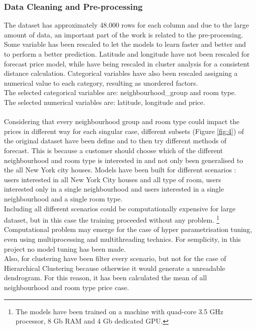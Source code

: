 \documentclass{FR16}
\begin{document}
\newpage
\subsubsection{Data Cleaning and Pre-processing}

The dataset has approximately 48.000 rows for each column and due to the large amount of data, an important part of the work is related to the pre-processing. Some variable has been rescaled to let the models to learn faster and better and to perform a better prediction. Latitude and longitude have not been rescaled for forecast price model, while have being rescaled in cluster analysis for a consistent distance calculation. Categorical variables have also been rescaled assigning a numerical value to each category, resulting as unordered factors.\\
The selected categorical variables are: neighbourhood\_group and room type.\\
The selected numerical variables are: latitude, longitude and price.
\\\\
Considering that every neighbourhood group and room type could impact the prices in different way for each singular case, different subsets (Figure \ref{fig:4}) of the original dataset have been define and to then try different methods of forecast. This is because a customer should choose which of the different neighbourhood and room type is interested in and not only been generalised to the all New York city houses. Models have been built for different scenarios : users interested in all New York City houses and all type of room, users interested only in a single neighbourhood and users interested in a single neighbourhood and a single room type. 
\\ Including all different scenarios could be computationally expensive for large dataset, but in this case the training proceeded without any problem. \footnote{ The models have been trained on a machine with quad-core 3.5 GHz processor, 8 Gb RAM and 4 Gb dedicated GPU.} Computational problem may emerge for the case of hyper parametrisation  tuning, even using multiprocessing and multithreading technics. For semplicity, in this project no model tuning has been made. \\
Also, for clustering have been filter every scenario, but not for the case of Hierarchical Clustering because otherwise it would generate a unreadable dendrogram. For this reason, it has been calculated the mean of all neighbourhood and room type price case. 
\end{document}
